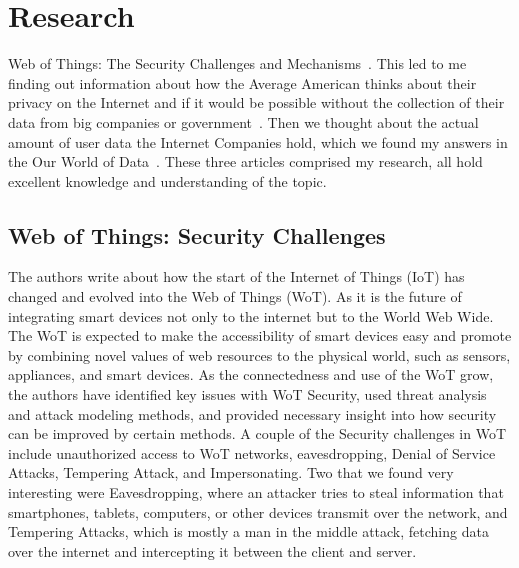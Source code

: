 \documentclass[10.5pt, twoside,twocolumn]{article}
\begin{document}

\section{Research}
Web of Things: The Security Challenges and Mechanisms~\cite{9349366}. This led to me finding out information about how the Average American thinks about their privacy on the Internet and if it would be possible without the collection of their data from big companies or government~\cite{auxier_rainie_anderson_perrin_kumar_turner_2020}. Then we thought about the actual amount of user data the Internet Companies hold, which we found my answers in the Our World of Data~\cite{owidinternet}. These three articles comprised my research, all hold excellent knowledge and understanding of the topic.

\subsection{Web of Things: Security Challenges}
The authors write about how the start of the Internet of Things (IoT) has changed and evolved into the Web of Things (WoT). As it is the future of integrating smart devices not only to the internet but to the World Web Wide. The WoT is expected to make the accessibility of smart devices easy and promote by combining novel values of web resources to the physical world, such as sensors, appliances, and smart devices. As the connectedness and use of the WoT grow, the authors have identified key issues with WoT Security, used threat analysis and attack modeling methods, and provided necessary insight into how security can be improved by certain methods. A couple of the Security challenges in WoT include unauthorized access to WoT networks, eavesdropping, Denial of Service Attacks, Tempering Attack, and Impersonating. Two that we found very interesting were Eavesdropping, where an attacker tries to steal information that smartphones, tablets, computers, or other devices transmit over the network, and Tempering Attacks, which is mostly a man in the middle attack, fetching data over the internet and intercepting it between the client and server.


\end{document}

